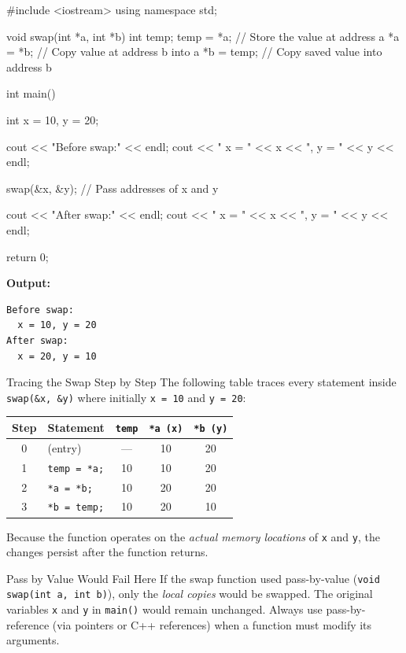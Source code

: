 \begin{cppcode}
#include <iostream>
using namespace std;

void swap(int *a, int *b)
{
    int temp;
    temp = *a;   // Store the value at address a
    *a = *b;     // Copy value at address b into a
    *b = temp;   // Copy saved value into address b
}

int main()
{
    int x = 10, y = 20;

    cout << "Before swap:" << endl;
    cout << "  x = " << x << ", y = " << y << endl;

    swap(&x, &y);   // Pass addresses of x and y

    cout << "After swap:" << endl;
    cout << "  x = " << x << ", y = " << y << endl;

    return 0;
}
\end{cppcode}

\noindent\textbf{Output:}
\begin{verbatim}
Before swap:
  x = 10, y = 20
After swap:
  x = 20, y = 10
\end{verbatim}

\begin{conceptbox}{Tracing the Swap Step by Step}
The following table traces every statement inside \texttt{swap(\&x, \&y)}
where initially \texttt{x\,=\,10} and \texttt{y\,=\,20}:

\begin{center}
\renewcommand{\arraystretch}{1.3}
\begin{tabular}{@{}clccc@{}}
\toprule
\textbf{Step} & \textbf{Statement}
    & \texttt{temp} & \texttt{*a (x)} & \texttt{*b (y)} \\
\midrule
0 & (entry)          & ---  & 10 & 20 \\
1 & \texttt{temp = *a;}  & 10   & 10 & 20 \\
2 & \texttt{*a = *b;}    & 10   & 20 & 20 \\
3 & \texttt{*b = temp;}  & 10   & 20 & 10 \\
\bottomrule
\end{tabular}
\end{center}

\noindent Because the function operates on the \emph{actual memory locations}
of \texttt{x} and \texttt{y}, the changes persist after the function returns.
\end{conceptbox}

\begin{warningbox}{Pass by Value Would Fail Here}
If the swap function used pass-by-value (\texttt{void swap(int a, int b)}),
only the \emph{local copies} would be swapped. The original variables
\texttt{x} and \texttt{y} in \texttt{main()} would remain unchanged.
Always use pass-by-reference (via pointers or C++ references) when a function
must modify its arguments.
\end{warningbox}

